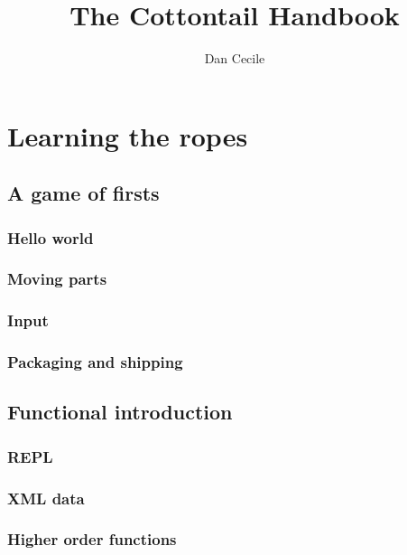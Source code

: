 \documentclass[draft]{memoir}
\begin{document}
\pagestyle{empty}

\title{The Cottontail Handbook}
\author{Dan Cecile}
\maketitle



\frontmatter



\cleartooddpage
\tableofcontents

\mainmatter

\part{Learning the ropes}



\chapter{A game of firsts}
\section{Hello world}
\section{Moving parts}
\section{Input}
\section{Packaging and shipping}

\chapter{Functional introduction}
\section{REPL}
\section{XML data}
\section{Higher order functions}
\end{document}
